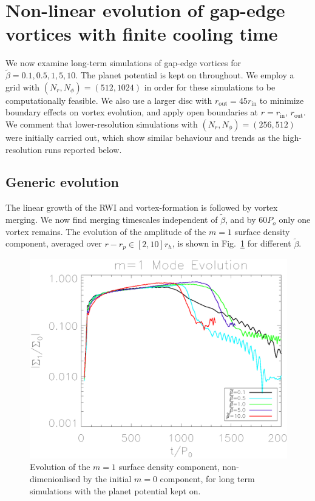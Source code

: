 
\section{Non-linear evolution of
  gap-edge vortices with finite cooling time}\label{nonlinear} 
We now examine long-term simulations of gap-edge vortices for
$\tilde{\beta}=0.1,0.5,1,5,10$. The planet potential is kept on
throughout. We employ a grid with $(N_r,N_{\phi})=(512,1024)$ in order
for these 
simulations to be computationally feasible. We also use a larger
disc with $r_{\mathrm{out}}=45r_{\mathrm{in}}$ to minimize boundary
effects on vortex evolution, and apply open boundaries at
$r=r_\mathrm{in},\,r_\mathrm{out}$. We comment that lower-resolution
simulations with $(N_r,N_{\phi})=(256,512)$ were initially carried
out, which show similar behaviour and trends as the high-resolution
runs reported below.   

\subsection{Generic evolution} 
The linear growth of the RWI and vortex-formation is followed by 
vortex merging. We now find merging timescales independent of
$\tilde\beta$, and by $60P_o$ only one vortex remains. 
The evolution of the amplitude of the $m=1$ surface density component,
averaged over $r-r_p\in[2,10]r_h$, is shown in Fig.~\ref{lifetimeplot} 
for different $\tilde\beta$. 

\begin{figure}
  \includegraphics[width=\linewidth,clip=true,trim=0.5cm
  0cm 0cm 1cm]{figures/longterm_stability}
  \caption{Evolution of the $m=1$ surface density component,
    non-dimenionlised by the initial $m=0$ component, for long term
    simulations with the planet potential kept on.\label{lifetimeplot}}   
\end{figure}

